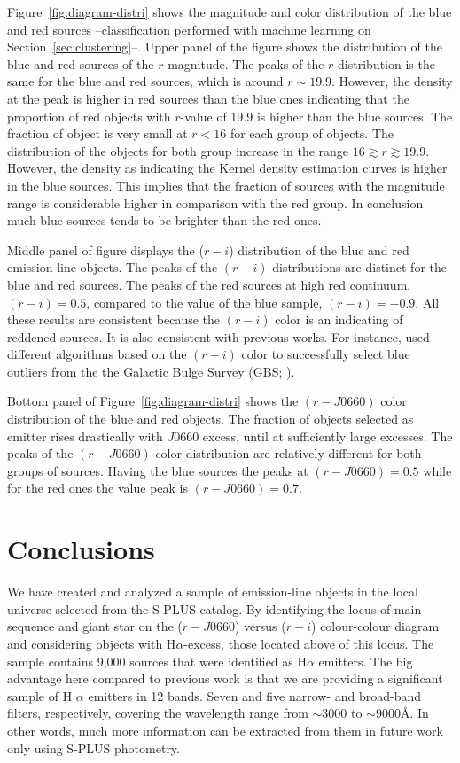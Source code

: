 \documentclass[fleqn,usenatbib]{mnras}
\begin{document}
Figure~\ref{fig:diagram-distri} shows the magnitude and color distribution of the blue and red 
sources --classification performed with machine learning on Section~\ref{sec:clustering}--.
Upper panel of the figure shows the distribution of the blue and red sources of the $r$-magnitude.
The peaks of the $r$ distribution is the same for the blue and red sources, which is around
$r \sim 19.9$. However, the density at the peak is higher in red sources than the blue ones
indicating that the proportion of red objects with $r$-value of 19.9 is higher than the blue sources. 
The fraction of object is very small at $r < 16$ for each group of objects.
The distribution of the objects for both group increase in the range $16 \gtrsim r \gtrsim
19.9$. However, the density as indicating the Kernel density estimation curves is higher in 
the blue sources. This implies that the fraction of sources with the magnitude range 
is considerable higher in comparison with the red group. In conclusion much blue sources 
tends to be brighter than the red ones.

Middle panel of figure displays the ($r - i$) distribution of the blue and red emission line
objects. The peaks of the $(r - i)$ distributions are distinct for the blue and red sources.
The peaks of the red sources at high red continuum,  $(r - i) = 0.5$, compared to the value
of the blue sample, $(r - i) = -0.9$. All these results are consistent because the $(r - i)$
color is an indicating of reddened sources. It is also consistent with previous works. 
For instance, \citet{Wevers:2017} used different algorithms based on the  $(r - i)$ color
to successfully select blue outliers from the the Galactic Bulge 
Survey (GBS; \citealp{Jonker:2011}).

Bottom panel of Figure~\ref{fig:diagram-distri} shows the
$(r - J0660)$ color distribution of the blue and red objects. The fraction of objects selected
as emitter rises drastically with $J$0660 excess, until at sufficiently large excesses. 
The peaks of the $(r - J0660)$ color distribution are relatively different for both groups 
of sources. Having the blue sources the peaks at  $(r - J0660) = 0.5$ while for the red 
ones the value peak is $(r - J0660) = 0.7$.

\section{Conclusions}
\label{sec:conclu}

We have created and analyzed a sample of emission-line objects in the 
local universe selected from the S-PLUS catalog.
By identifying the locus of main-sequence and giant star on the ($r - J0660$) versus ($r - i$) 
colour-colour diagram and considering objects 
with H$\alpha$-excess, those located above of this locus. 
The sample contains 9,000 sources that were identified as H{$\alpha$} emitters.
The big advantage here compared to previous work is that we are providing a significant 
sample of H $\alpha$ emitters in 12 bands. Seven and five narrow- and broad-band filters,
respectively, covering the wavelength range from $\sim$3000 to $\sim$9000\AA. 
In other words, much more information can be extracted from them in future work only using S-PLUS photometry. 
\end{document}

